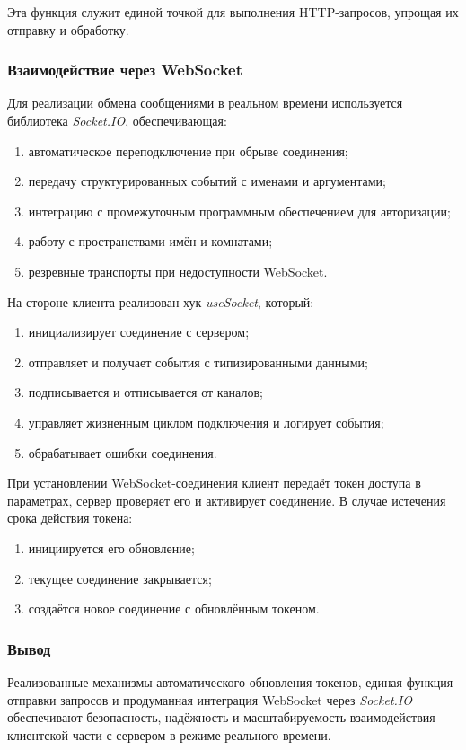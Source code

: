 Эта функция служит единой точкой для выполнения HTTP-запросов, упрощая их отправку и обработку.

\subsubsection{Взаимодействие через WebSocket}
Для реализации обмена сообщениями в реальном времени используется библиотека \textit{Socket.IO}, обеспечивающая:
\begin{enumerate}
  \item автоматическое переподключение при обрыве соединения;
  \item передачу структурированных событий с именами и аргументами;
  \item интеграцию с промежуточным программным обеспечением для авторизации;
  \item работу с пространствами имён и комнатами;
  \item резревные транспорты при недоступности WebSocket.
\end{enumerate}

На стороне клиента реализован хук \textit{useSocket}, который:
\begin{enumerate}
  \item инициализирует соединение с сервером;
  \item отправляет и получает события с типизированными данными;
  \item подписывается и отписывается от каналов;
  \item управляет жизненным циклом подключения и логирует события;
  \item обрабатывает ошибки соединения.
\end{enumerate}

При установлении WebSocket-соединения клиент передаёт токен доступа в параметрах, сервер проверяет его и активирует соединение. В случае истечения срока действия токена:
\begin{enumerate}
  \item инициируется его обновление;
  \item текущее соединение закрывается;
  \item создаётся новое соединение с обновлённым токеном.
\end{enumerate}

\subsubsection*{Вывод}

Реализованные механизмы автоматического обновления токенов, единая функция отправки запросов и продуманная интеграция WebSocket через \textit{Socket.IO} обеспечивают безопасность, надёжность и масштабируемость взаимодействия клиентской части с сервером в режиме реального времени.
